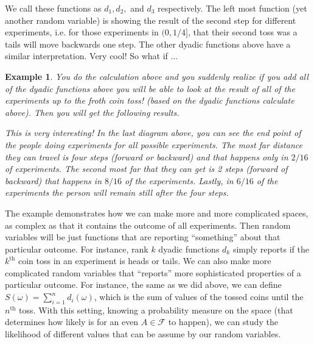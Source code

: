 \documentclass[11pt,a4paper]{article}
\theoremstyle{Example}
\newtheorem{example}{Example}
\begin{document}
 	We call these functions as $ d_1,d_2, $ and $ d_3 $ respectively. The left most function (yet another random variable) is showing the result of the second step for different experiments, i.e. for those experiments in $ (0,1/4] $, that their second toss was a tails will move backwards one step. The other dyadic functions above have a similar interpretation. Very cool! So what if ... 
 	
 	\begin{example}
 		You do the calculation above and you suddenly realize if you add all of the dyadic functions above you will be able to look at the result of all of the experiments up to the froth coin toss! (based on the dyadic functions calculate above). Then you will get the following results.
 		
 		\FloatBarrier
 		\noindent This is very interesting! In the last diagram above, you can see the end point of the people doing experiments for all possible experiments. The most far distance they can travel is four steps (forward or backward) and that happens only in $ 2/16 $ of experiments. The second most far that they can get is 2 steps (forward of backward) that happens in $ 8/16 $ of the experiments. Lastly, in $ 6/16 $ of the experiments the person will remain still after the four steps.
 	\end{example}
 	
 	
 	The example demonstrates how we can make more and more complicated spaces, as complex as that it contains the outcome of all experiments. Then random variables will be just functions that are reporting ``something'' about that particular outcome. For instance, rank $ k $ dyadic functions $ d_k $ simply reports if the $ k^\text{th} $ coin toss in an experiment is heads or tails. We can also make more complicated random variables that ``reports'' more sophisticated properties of a particular outcome. For instance, the same as we did above, we can define $ S(\omega) = \sum_{i=1}^n d_i(\omega) $, which is the sum of values of the tossed coins until the $ n^\text{th} $ toss. With this setting, knowing a probability measure on the space (that determines how likely is for an even $ A \in \mathcal{F} $ to happen), we can study the likelihood of different values that can be assume by our random variables.  
 	
 	
\end{document}
